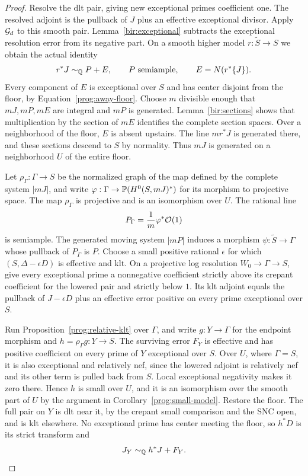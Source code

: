 \begin{proof}
Resolve the dlt pair, giving new exceptional primes coefficient
one.  The resolved adjoint is the pullback of \(J\) plus an
effective exceptional divisor.  Apply \(\mathcal G_d\) to this
smooth pair.  Lemma~\ref{bir:exceptional} subtracts the
exceptional resolution error from its negative part.  On a
smooth higher model \(r:\widetilde S\to S\) we obtain the actual
identity
\begin{equation}
 r^*J\sim_{\Q}P+E,\qquad P\ \text{semiample},\qquad
 E=N(r^*\{J\}).
 \label{prog:stratum-decomposition}
\end{equation}
Every component of \(E\) is exceptional over \(S\) and has
center disjoint from the floor, by Equation~\eqref{prog:away-floor}.
Choose \(m\) divisible enough that \(mJ,mP,mE\) are integral and
\(mP\) is generated.  Lemma~\ref{bir:sections} shows that
multiplication by the section of \(mE\) identifies the complete
section spaces.  Over a neighborhood of the floor, \(E\) is
absent upstairs.  The line \(mr^*J\) is generated there, and
these sections descend to \(S\) by normality.  Thus \(mJ\)
is generated on a neighborhood \(U\) of the entire floor.

Let \(\rho_\Gamma:\Gamma\to S\) be the normalized graph of the map defined by
the complete system \(|mJ|\), and write
\(\varphi:\Gamma\to\mathbb P(H^0(S,mJ)^*)\) for its morphism to projective
space. The map \(\rho_\Gamma\) is projective and is an isomorphism over \(U\).
The rational line
\[
 P_\Gamma=\frac1m\varphi^*\mathcal O(1)
\]
is semiample. The generated moving system \(|mP|\) induces a morphism
\(\psi:\widetilde S\to\Gamma\) whose pullback of \(P_\Gamma\) is \(P\).
Choose a small positive rational \(\epsilon\)
for which \((S,\Delta-\epsilon D)\) is effective and klt.
On a projective log resolution \(W_0\to\Gamma\to S\), give
every exceptional prime a nonnegative coefficient strictly
above its crepant coefficient for the lowered pair and strictly
below \(1\).  Its klt adjoint equals the pullback of
\(J-\epsilon D\) plus an effective error positive on every
prime exceptional over \(S\).

Run Proposition~\ref{prog:relative-klt} over \(\Gamma\), and write
\(g:Y\to\Gamma\) for the endpoint morphism and \(h=\rho_\Gamma g:Y\to S\).
The surviving
error \(F_Y\) is effective and has positive coefficient on
every prime of \(Y\) exceptional over \(S\).  Over \(U\), where
\(\Gamma=S\), it is also exceptional and relatively nef, since
the lowered adjoint is relatively nef and its other term is
pulled back from \(S\).  Local exceptional negativity makes it
zero there.  Hence \(h\) is small over \(U\), and it is an
isomorphism over the smooth part of \(U\) by the argument in
Corollary~\ref{prog:small-model}.  Restore the floor.  The full
pair on \(Y\) is dlt near it, by the crepant small comparison
and the SNC open, and is klt elsewhere.  No exceptional prime
has center meeting the floor, so \(h^*D\) is its strict
transform and
\[
 J_Y\sim_{\mathbb Q}h^*J+F_Y.
\]


\end{proof}
